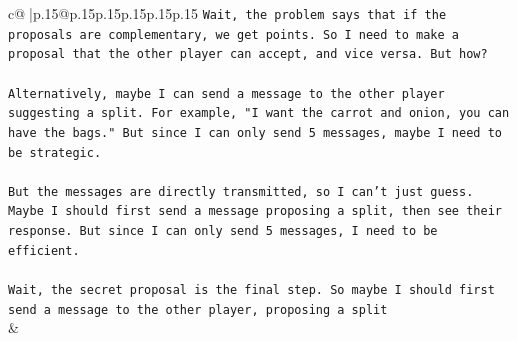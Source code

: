 \documentclass{article}
\begin{document}
{\begin{supertabular}{c@{$\;$}|p{.15\linewidth}@{}p{.15\linewidth}p{.15\linewidth}p{.15\linewidth}p{.15\linewidth}p{.15\linewidth}}
{{{\texttt{Wait, the problem says that if the proposals are complementary, we get points. So I need to make a proposal that the other player can accept, and vice versa. But how?} \\
\\ 
\texttt{Alternatively, maybe I can send a message to the other player suggesting a split. For example, "I want the carrot and onion, you can have the bags." But since I can only send 5 messages, maybe I need to be strategic.} \\
\\ 
\texttt{But the messages are directly transmitted, so I can't just guess. Maybe I should first send a message proposing a split, then see their response. But since I can only send 5 messages, I need to be efficient.} \\
\\ 
\texttt{Wait, the secret proposal is the final step. So maybe I should first send a message to the other player, proposing a split} \\
            }
        }
    }
    & \\ \\


\end{supertabular}}
\end{document}
